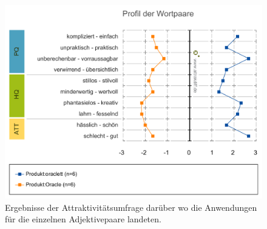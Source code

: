 \documentclass[oneside,bibliography=totocnumbered,BCOR=5mm]{scrbook}
\begin{document}
\begin{figure}[H]
  \centering
  \includegraphics[scale=0.35]{attrak-wortpaare.png}
  \caption{Ergebnisse der Attraktivitätsumfrage darüber wo die Anwendungen für die einzelnen Adjektivepaare landeten.}
  \label{fig:attrak-wortpaare}
\end{figure}
\end{document}
